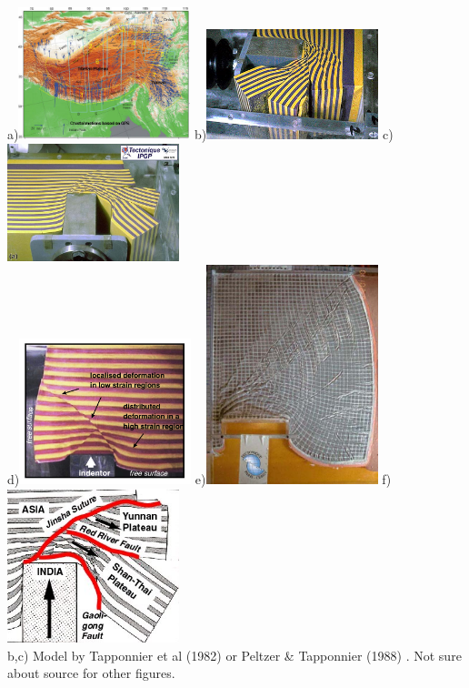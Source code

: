 \begin{center}
a)\includegraphics[width=5cm]{images/benchmark_punch/gps}
b)\includegraphics[width=5cm]{images/benchmark_punch/img5}
c)\includegraphics[width=5cm]{images/benchmark_punch/img7}\\
d)\includegraphics[width=5cm]{images/benchmark_punch/img6}
e)\includegraphics[width=5cm]{images/benchmark_punch/img8}
f)\includegraphics[width=5cm]{images/benchmark_punch/img11}\\
{\captionfont b,c) Model by Tapponnier et al (1982) \cite{tapl82} or 
Peltzer \& Tapponnier (1988) \cite{peta88}. Not sure about source for other figures.}
\end{center}
